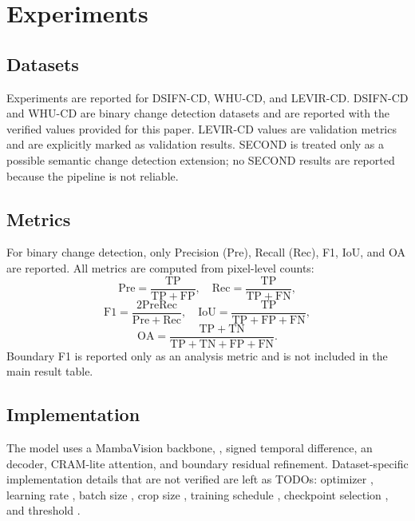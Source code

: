 \section{Experiments}

\subsection{Datasets}

Experiments are reported for DSIFN-CD, WHU-CD, and LEVIR-CD. DSIFN-CD and WHU-CD are binary change detection datasets and are reported with the verified values provided for this paper. LEVIR-CD values are validation metrics and are explicitly marked as validation results. SECOND is treated only as a possible semantic change detection extension; no SECOND results are reported because the pipeline is not reliable.

\subsection{Metrics}

For binary change detection, only Precision (Pre), Recall (Rec), F1, IoU, and OA are reported. All metrics are computed from pixel-level counts:
\begin{equation}
\mathrm{Pre}=\frac{\mathrm{TP}}{\mathrm{TP}+\mathrm{FP}}, \quad
\mathrm{Rec}=\frac{\mathrm{TP}}{\mathrm{TP}+\mathrm{FN}},
\end{equation}
\begin{equation}
\mathrm{F1}=\frac{2\mathrm{Pre}\mathrm{Rec}}{\mathrm{Pre}+\mathrm{Rec}}, \quad
\mathrm{IoU}=\frac{\mathrm{TP}}{\mathrm{TP}+\mathrm{FP}+\mathrm{FN}},
\end{equation}
\begin{equation}
\mathrm{OA}=\frac{\mathrm{TP}+\mathrm{TN}}{\mathrm{TP}+\mathrm{TN}+\mathrm{FP}+\mathrm{FN}}.
\end{equation}
Boundary F1 is reported only as an analysis metric and is not included in the main result table.

\subsection{Implementation}

The model uses a MambaVision backbone, \drbi, signed temporal difference, an \arf{} decoder, CRAM-lite attention, and boundary residual refinement. Dataset-specific implementation details that are not verified are left as TODOs: optimizer , learning rate , batch size , crop size , training schedule , checkpoint selection , and threshold .

